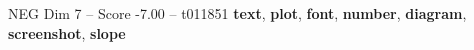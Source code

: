 \begin{textsample}{NEG Dim 7 – Score -7.00 – t011851}  \label{ex:f7_neg_027}
\textbf{text}, \textbf{plot}, \textbf{font}, \textbf{number}, \textbf{diagram}, \textbf{screenshot}, \textbf{slope}

\end{textsample}

